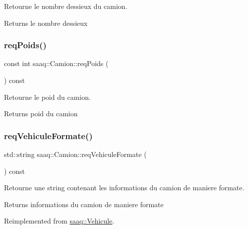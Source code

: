 Retourne le nombre d\textquotesingle{}essieux du camion. 

\begin{DoxyReturn}{Returns}
le nombre d\textquotesingle{}essieux 
\end{DoxyReturn}
\mbox{\label{classsaaq_1_1Camion_ab024fec200c2aa4484645da93155cdd2}} 
\subsubsection{\texorpdfstring{req\+Poids()}{reqPoids()}}
{\footnotesize\ttfamily const int saaq\+::\+Camion\+::req\+Poids (\begin{DoxyParamCaption}{ }\end{DoxyParamCaption}) const}



Retourne le poid du camion. 

\begin{DoxyReturn}{Returns}
poid du camion 
\end{DoxyReturn}
\mbox{\label{classsaaq_1_1Camion_a7e352c9d011c145497fa19d16482bd9a}} 
\subsubsection{\texorpdfstring{req\+Vehicule\+Formate()}{reqVehiculeFormate()}}
{\footnotesize\ttfamily std\+::string saaq\+::\+Camion\+::req\+Vehicule\+Formate (\begin{DoxyParamCaption}{ }\end{DoxyParamCaption}) const\hspace{0.3cm}{\ttfamily [virtual]}}



Retourne une string contenant les informations du camion de maniere formate. 

\begin{DoxyReturn}{Returns}
informations du camion de maniere formate 
\end{DoxyReturn}


Reimplemented from \hyperlink{classsaaq_1_1Vehicule_a9d0ff95273ecd7858cf9bd12aac359ba}{saaq\+::\+Vehicule}.

